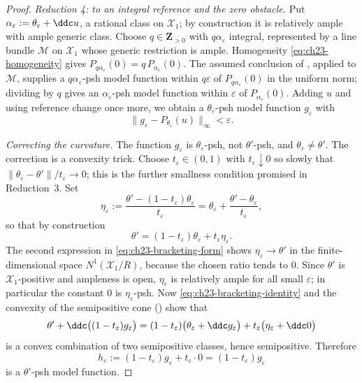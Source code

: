 \begin{proof}
\emph{Reduction 4: to an integral reference and the zero obstacle.}
Put \(\alpha_\varepsilon:=\theta_\varepsilon+\ddc u\), a rational class on
\(\mathcal X_1\); by construction it is relatively ample with ample generic
class.  Choose \(q\in\mathbf Z_{>0}\) with \(q\alpha_\varepsilon\) integral,
represented by a line bundle \(\mathcal M\) on \(\mathcal X_1\) whose
generic restriction is ample.  Homogeneity
\eqref{eq:ch23-homogeneity} gives
\(P_{q\alpha_\varepsilon}(0)=q\,P_{\alpha_\varepsilon}(0)\).  The assumed
conclusion of , applied to
\(\mathcal M\), supplies a \(q\alpha_\varepsilon\)-psh model function within
\(q\varepsilon\) of \(P_{q\alpha_\varepsilon}(0)\) in the uniform norm;
dividing by \(q\) gives an \(\alpha_\varepsilon\)-psh model function within
\(\varepsilon\) of \(P_{\alpha_\varepsilon}(0)\).  Adding \(u\) and using
reference change once more, we obtain a \(\theta_\varepsilon\)-psh model
function \(g_\varepsilon\) with
\begin{equation}\label{eq:ch23-rational-model-approximant}
       \|g_\varepsilon-P_{\theta_\varepsilon}(u)\|_\infty<\varepsilon.
\end{equation}

\emph{Correcting the curvature.}
The function \(g_\varepsilon\) is \(\theta_\varepsilon\)-psh, not
\(\theta'\)-psh, and \(\theta_\varepsilon\ne\theta'\).  The correction is a
convexity trick.  Choose \(t_\varepsilon\in(0,1)\) with
\(t_\varepsilon\downarrow0\) so slowly that
\(\|\theta_\varepsilon-\theta'\|/t_\varepsilon\to0\); this is the further
smallness condition promised in Reduction~3.  Set
\begin{equation}\label{eq:ch23-bracketing-form}
       \eta_\varepsilon
       :=\frac{\theta'-(1-t_\varepsilon)\theta_\varepsilon}
                    {t_\varepsilon}
        =\theta_\varepsilon
         +\frac{\theta'-\theta_\varepsilon}{t_\varepsilon},
\end{equation}
so that by construction
\begin{equation}\label{eq:ch23-bracketing-identity}
 \theta'=(1-t_\varepsilon)\theta_\varepsilon
        +t_\varepsilon\eta_\varepsilon .
\end{equation}
The second expression in \eqref{eq:ch23-bracketing-form} shows
\(\eta_\varepsilon\to\theta'\) in the finite-dimensional space
\(N^1(\mathcal X_1/R)\), because the chosen ratio tends to \(0\).  Since
\(\theta'\) is \(\mathcal X_1\)-positive and ampleness is open,
\(\eta_\varepsilon\) is relatively ample for all small \(\varepsilon\); in
particular the constant \(0\) is \(\eta_\varepsilon\)-psh.  Now
\eqref{eq:ch23-bracketing-identity} and the convexity of the semipositive
cone () show that
\[
 \theta'+\ddc\bigl((1-t_\varepsilon)g_\varepsilon\bigr)
 =(1-t_\varepsilon)\bigl(\theta_\varepsilon+\ddc g_\varepsilon\bigr)
  +t_\varepsilon\bigl(\eta_\varepsilon+\ddc 0\bigr)
\]
is a convex combination of two semipositive classes, hence semipositive.
Therefore
\[
                   h_\varepsilon
                   :=(1-t_\varepsilon)g_\varepsilon
                    +t_\varepsilon\cdot 0
                   =(1-t_\varepsilon)g_\varepsilon
\]
is a \(\theta'\)-psh model function.


\end{proof}
